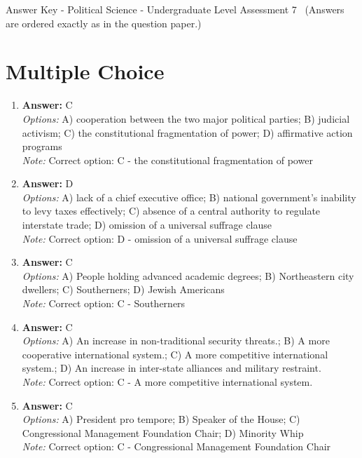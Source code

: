 \documentclass[12pt]{article}
\begin{document}
\begin{center}
Answer Key - Political Science - Undergraduate Level Assessment 7 \
\small (Answers are ordered exactly as in the question paper.)
\end{center}

\section*{Multiple Choice}
\begin{enumerate}[label=\arabic*.]
\item \textbf{Answer:} C
\\ \textit{Options:} A) cooperation between the two major political parties; B) judicial activism; C) the constitutional fragmentation of power; D) affirmative action programs
\\ \textit{Note:} Correct option: C - the constitutional fragmentation of power
\item \textbf{Answer:} D
\\ \textit{Options:} A) lack of a chief executive office; B) national government's inability to levy taxes effectively; C) absence of a central authority to regulate interstate trade; D) omission of a universal suffrage clause
\\ \textit{Note:} Correct option: D - omission of a universal suffrage clause
\item \textbf{Answer:} C
\\ \textit{Options:} A) People holding advanced academic degrees; B) Northeastern city dwellers; C) Southerners; D) Jewish Americans
\\ \textit{Note:} Correct option: C - Southerners
\item \textbf{Answer:} C
\\ \textit{Options:} A) An increase in non-traditional security threats.; B) A more cooperative international system.; C) A more competitive international system.; D) An increase in inter-state alliances and military restraint.
\\ \textit{Note:} Correct option: C - A more competitive international system.
\item \textbf{Answer:} C
\\ \textit{Options:} A) President pro tempore; B) Speaker of the House; C) Congressional Management Foundation Chair; D) Minority Whip
\\ \textit{Note:} Correct option: C - Congressional Management Foundation Chair
\end{enumerate}
\end{document}
